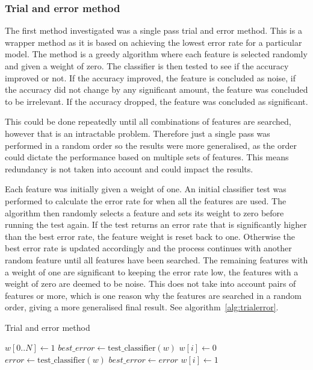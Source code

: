 \subsubsection{Trial and error method}
The first method investigated was a single pass trial and error method. This is a wrapper method as it is based on achieving the
lowest error rate for a particular model. The method is a greedy algorithm where each feature is selected randomly and given a
weight of zero. The classifier is then tested to see if the accuracy improved or not. If the accuracy improved, the feature is
concluded as noise, if the accuracy did not change by any significant amount, the feature was concluded to be irrelevant. If the
accuracy dropped, the feature was concluded as significant.

This could be done repeatedly until all combinations of features are searched, however that is an intractable problem. Therefore
just a single pass was performed in a random order so the results were more generalised, as the order could dictate the
performance based on multiple sets of features. This means redundancy is not taken into account and could impact the results.

Each feature was initially given a weight of one. An initial classifier test was performed to calculate the error rate for when
all the features are used. The algorithm then randomly selects a feature and sets its weight to zero before running the test
again. If the test returns an error rate that is significantly higher than the best error rate, the feature weight is reset back
to one. Otherwise the best error rate is updated accordingly and the process continues with another random feature until all
features have been searched. The remaining features with a weight of one are significant to keeping the error rate low, the
features with a weight of zero are deemed to be noise. This does not take into account pairs of features or more, which is one
reason why the features are searched in a random order, giving a more generalised final result.
See algorithm~\ref{alg:trialerror}.

\begin{algorithm}
    \caption{Trial and error method}
    \label{alg:trialerror}
    \begin{algorithmic}
        \STATE $w[0..N] \gets 1$
        \STATE $best\_ error \gets \mathrm{test\_ classifier}(w)$
            \STATE $w[i] \gets 0$
            \STATE $error \gets \mathrm{test\_ classifier}(w)$
                \STATE $best\_error \gets error$
                \STATE $w[i] \gets 1$
            \ENDIF
        \ENDFOR
    \end{algorithmic}
\end{algorithm}

